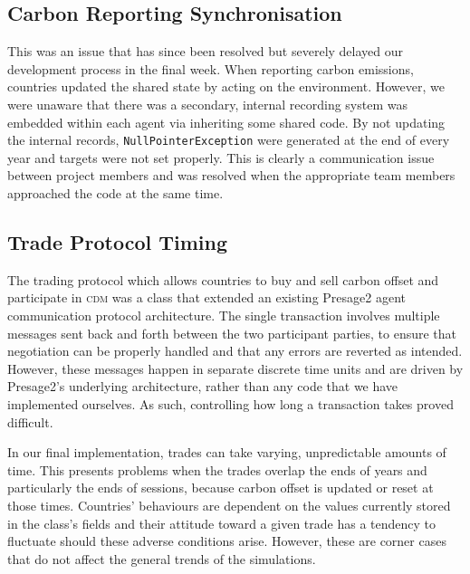 \subsection{Carbon Reporting Synchronisation}

This was an issue that has since been resolved but severely delayed our development process in the final week. When reporting carbon emissions, countries updated the shared state by acting on the environment. However, we were unaware that there was a secondary, internal recording system was embedded within each agent via inheriting some shared code. By not updating the internal records, \texttt{NullPointerException} were generated at the end of every year and targets were not set properly. This is clearly a communication issue between project members and was resolved when the appropriate team members approached the code at the same time.

\subsection{Trade Protocol Timing}

The trading protocol which allows countries to buy and sell carbon offset and participate in \textsc{cdm} was a class that extended an existing Presage2 agent communication protocol architecture. The single transaction involves multiple messages sent back and forth between the two participant parties, to ensure that negotiation can be properly handled and that any errors are reverted as intended. However, these messages happen in separate discrete time units and are driven by Presage2's underlying architecture, rather than any code that we have implemented ourselves. As such, controlling how long a transaction takes proved difficult.

In our final implementation, trades can take varying, unpredictable amounts of time. This presents problems when the trades overlap the ends of years and particularly the ends of sessions, because carbon offset is updated or reset at those times. Countries' behaviours are dependent on the values currently stored in the class's fields and their attitude toward a given trade has a tendency to fluctuate should these adverse conditions arise. However, these are corner cases that do not affect the general trends of the simulations.
